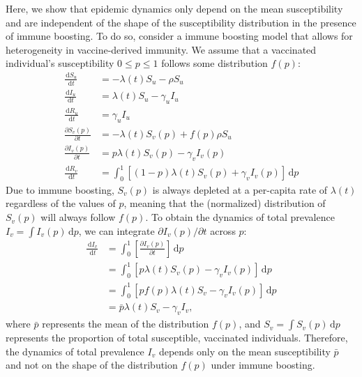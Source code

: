 \documentclass[12pt]{article}
\newcommand{\dd}[1]{\ensuremath{\, \mathrm{d}#1}}
\begin{document}
Here, we show that epidemic dynamics only depend on the mean susceptibility and are independent of the shape of the susceptibility distribution in the presence of immune boosting.
To do so, consider a immune boosting model that allows for heterogeneity in vaccine-derived immunity.
We assume that a vaccinated individual's susceptibility $0 \leq p \leq 1$ follows some distribution $f(p)$:
\begin{align}
\frac{\dd S_u}{\dd t} &= - \lambda(t) S_u - \rho S_u \\
\frac{\dd I_u}{\dd t} &= \lambda(t) S_u - \gamma_u I_u \\
\frac{\dd R_u}{\dd t} &= \gamma_u I_u \\
\frac{\partial S_v(p)}{\partial t} &= - \lambda(t) S_v(p) + f(p) \rho S_u  \\
\frac{\partial I_v(p)}{\partial t} &= p \lambda(t) S_v(p) - \gamma_v I_v(p) \\
\frac{\dd R_v}{\dd t} &= \int_0^1 \left[ (1-p) \lambda(t) S_v(p) + \gamma_v I_v(p) \right]\dd p
\end{align}
Due to immune boosting, $S_v(p)$ is always depleted at a per-capita rate of $\lambda(t)$ regardless of the values of $p$, meaning that the (normalized) distribution of $S_v(p)$ will always follow $f(p)$.
To obtain the dynamics of total prevalence $I_v = \int I_v(p) \dd p$, we can integrate $\partial I_v(p)/\partial t$ across $p$:
\begin{align}
\frac{\dd I_v}{\dd t} &=  \int_0^1\left[\frac{\partial I_v(p)}{\partial t}\right]\dd p\\
&= \int_0^1\left[p \lambda(t) S_v(p) - \gamma_v I_v(p)\right]\dd p\\
&= \int_0^1\left[p f(p) \lambda(t) S_v - \gamma_v I_v(p)\right]\dd p\\
&= \bar{p} \lambda(t) S_v - \gamma_v I_v,
\end{align}
where $\bar{p}$ represents the mean of the distribution $f(p)$, and $S_v = \int S_v(p) \dd p$ represents the proportion of total susceptible, vaccinated individuals.
Therefore, the dynamics of total prevalence $I_v$ depends only on the mean susceptibility $\bar{p}$ and not on the shape of the distribution $f(p)$ under immune boosting.

\pagebreak


\end{document}

